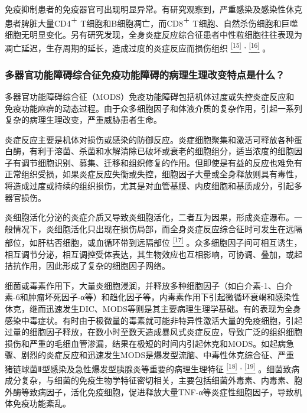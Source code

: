 免疫抑制患者的免疫器官可出现明显异常。有研究观察到，严重感染及感染性休克患者脾脏大量CD4\textsuperscript{＋}
T细胞和B细胞凋亡，而CD8\textsuperscript{＋}
T细胞、自然杀伤细胞和巨噬细胞无明显变化。另有研究发现，全身炎症反应综合征患者中性粒细胞往往表现为凋亡延迟，生存周期的延长，造成过度的炎症反应而损伤组织
\protect\hyperlink{text00007.htmlux5cux23ch15-6}{\textsuperscript{{[}15{]}}}
\textsuperscript{,}
\protect\hyperlink{text00007.htmlux5cux23ch16-6}{\textsuperscript{{[}16{]}}}
。

\subsubsection{多器官功能障碍综合征免疫功能障碍的病理生理改变特点是什么？}

多器官功能障碍综合征（MODS）免疫功能障碍包括机体过度或失控炎症反应和免疫功能麻痹的动态过程。由于众多细胞因子和体液介质的复杂作用，引起一系列复杂的病理生理改变，严重威胁患者生命。

炎症反应主要是机体对损伤或感染的防御反应。炎症细胞聚集和激活可释放各种蛋白酶，有利于溶菌、杀菌和水解清除已破坏或衰老的细胞组分，适当浓度的细胞因子有调节细胞识别、募集、迁移和组织修复的作用。但即使是有益的反应也难免有正常组织受损，如果炎症反应失衡或失控，细胞因子大量或全身释放则具有毒性，将造成过度或持续的组织损伤，尤其是对血管基膜、内皮细胞和基质成分，引起多器官损伤。

炎细胞活化分泌的炎症介质又导致炎细胞活化，二者互为因果，形成炎症瀑布。一般情况下，炎细胞活化只出现在损伤局部，而全身炎症反应综合征时可发生在远隔部位，如肝枯否细胞，或血循环带到远隔部位
\protect\hyperlink{text00007.htmlux5cux23ch17-6}{\textsuperscript{{[}17{]}}}
。众多细胞因子间可相互诱生，相互调节分泌，相互调控受体表达，其生物效应也互相影响，可协调、叠加，或起拮抗作用，因此形成了复杂的细胞因子网络。

细菌或毒素作用下，大量炎细胞浸润，并释放多种细胞因子（如白介素-1、白介素-6和肿瘤坏死因子-α等）和趋化因子等，内毒素作用下引起微循环衰竭和感染性休克，继而迅速发生DIC、MODS等则是其主要病理生理学基础。有的表现为全身感染中毒症状。有时由于极微量的毒素就可能非特异性激活大量的免疫细胞，引起过量的细胞因子释放，在数小时至数天造成暴风式炎症反应，导致广泛的组织细胞损伤和严重的毛细血管渗漏，结果在极短的时间内引起休克和MODS。如起病急骤、剧烈的炎症反应和迅速发生MODS是爆发型流脑、中毒性休克综合征、严重猪链球菌Ⅱ型感染及急性爆发型胰腺炎等重要的病理生理特征
\protect\hyperlink{text00007.htmlux5cux23ch18-6}{\textsuperscript{{[}18{]}}}
\textsuperscript{,}
\protect\hyperlink{text00007.htmlux5cux23ch19-6}{\textsuperscript{{[}19{]}}}
。细菌致病成分复杂，与细菌的免疫生物学特征密切相关，主要包括细菌外毒素、内毒素、胞外酶等致病因子，活化免疫细胞，促进释放大量TNF-α等炎症性细胞因子，导致机体免疫功能紊乱。

